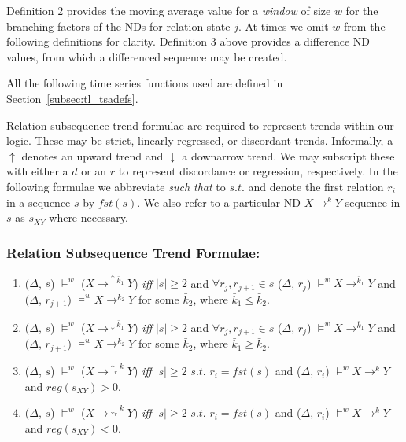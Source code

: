 Definition 2 provides the moving average value for a {\em window} of size
$w$ for the branching
factors of the NDs for relation state $j$. At times we omit $w$ from the
following definitions for clarity. Definition 3 above provides a
difference ND values, from which a differenced sequence may be created.

All the following time
series functions used are defined in Section~\ref{subsec:tl_tsadefs}.

Relation subsequence trend formulae are required to represent trends
within our logic. These may be strict, linearly regressed, or
discordant trends. Informally, a $\uparrow$ denotes an upward trend
and $\downarrow$ a downarrow trend. We may subscript these with either
a $d$ or an $r$ to represent discordance or regression, respectively. 
In the following formulae we abbreviate {\em such that} to $s.t.$ and
denote the first relation $r_i$ in a sequence $s$ by $fst(s)$. We also
refer to a particular ND $X \to^k Y$ sequence in 
$s$ as $s_{XY}$ where necessary.

\subsubsection{Relation Subsequence Trend Formulae:}

\begin{enumerate}

\item\label{item:ma_inc}($\Delta$, $s$) $\models^w$ ($X
\to^{\uparrow\bar{k}_1} Y$) { \em iff } $\mid s \mid \ge 2$ and $ \forall r_{j},r_{j+1} \in
s$ ($\Delta$, $r_j$) 
$\models^w X \to^{\bar{k}_1} Y$ and ($\Delta$, $r_{j+1}$) 
$\models^w X \to^{\bar{k}_2} Y$ for some $\bar{k}_2$, where $\bar{k}_1 \le
\bar{k}_2$.



\item\label{item:ma_dec}($\Delta$, $s$) $\models^w$ ($X
\to^{\downarrow\bar{k}_1} Y$) { \em iff } $\mid s \mid \ge 2$ and $ \forall r_{j},r_{j+1} \in
s$ ($\Delta$, $r_j$) 
$\models^w X \to^{\bar{k}_1} Y$ and ($\Delta$, $r_{j+1}$) 
$\models^w X \to^{\bar{k}_2} Y$  for some $\bar{k}_2$, where $\bar{k}_1 \ge
\bar{k}_2$.  


\item\label{item:reg_tren_up}($\Delta$, $s$) $\models^w$ ($X
\to^{\uparrow_{r}{k}} Y$) { \em iff } $\mid s \mid \ge 2$ $s.t.$ $r_i
= fst(s)$ and 
($\Delta$, $r_i$)  $\models^w X \to^{k} Y$ and $reg(s_{XY}) > 0$.


\item\label{item:reg_tren_dn}($\Delta$, $s$) $\models^w$ ($X
\to^{\downarrow_{r}{k}} Y$) { \em iff } $\mid s \mid \ge 2$ $s.t.$
$r_i = fst(s)$ and 
($\Delta$, $r_i$)  $\models^w X \to^{k} Y$ and $reg(s_{XY}) < 0$. 

\end{enumerate}

